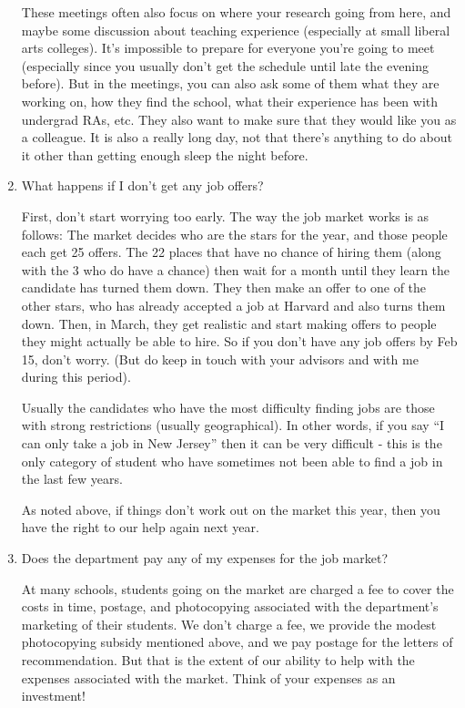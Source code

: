 \documentclass{econtex}
\begin{document}
\begin{enumerate}
These meetings often also focus on where your research going from
here, and maybe some discussion about teaching experience (especially
at small liberal arts colleges).  It's impossible to prepare for
everyone you're going to meet (especially since you usually don't get
the schedule until late the evening before).  But in the meetings, you
can also ask some of them what they are working on, how they find the
school, what their experience has been with undergrad RAs, etc.  They
also want to make sure that they would like you as a colleague.  It is
also a really long day, not that there's anything to do about it other
than getting enough sleep the night before.



\item {} 
What happens if I don't get any job offers?

First, don't start worrying too early.  The way the job market works
is as follows: The market decides who are the stars for the year, and
those people each get 25 offers.  The 22 places that have no chance of
hiring them (along with the 3 who do have a chance) then wait for a
month until they learn the candidate has turned them down.  They then
make an offer to one of the other stars, who has already accepted a
job at Harvard and also turns them down.  Then, in March, they get
realistic and start making offers to people they might actually be
able to hire.  So if you don't have any job offers by Feb 15, don't
worry.  (But do keep in touch with your advisors and with me during this
period).

Usually the candidates who have the most difficulty finding jobs are
those with strong restrictions (usually geographical).  In other
words, if you say ``I can only take a job in New Jersey'' then it can
be very difficult - this is the only category of student who 
have sometimes not been able to find a job in the last few years.

As noted above, if things don't work out on the market this year, then
you have the right to our help again next year.

\item Does the department pay any of my expenses for the job market?
  
  At many schools, students going on the market are charged a fee to
  cover the costs in time, postage, and photocopying associated with
  the department's marketing of their students.  We don't charge a
  fee, we provide the modest photocopying subsidy mentioned above, and
  we pay postage for the letters of recommendation.  But that is the
  extent of our ability to help with the expenses associated with the
  market.  Think of your expenses as an investment!



\end{enumerate}
\end{document}
